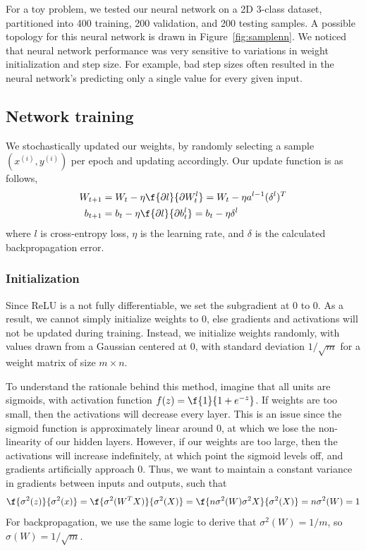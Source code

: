 \documentclass{article}
\begin{document}
\begin{multicols}{2}
For a toy problem, we tested our neural network on a 2D 3-class dataset,
partitioned into 400 training, 200 validation, and 200 testing samples.
A possible topology for this neural network is drawn in Figure~\ref{fig:samplenn}.
We noticed that neural network performance was very sensitive to 
variations in weight initialization and step size.
For example, bad step sizes often resulted in
the neural network's predicting only a single value for every given input.

\subsection{Network training}

We stochastically updated our weights,
by randomly selecting a sample $(x^{(i)}, y^{(i)})$ per epoch
and updating accordingly.
Our update function is as follows,
\begin{align}
W_{t+1} &= W_t - \eta \f{\partial l}{\partial W_t^l}
= W_t - \eta a^{l-1} (\delta^l)^T \\
b_{t+1} &= b_t - \eta \f{\partial l}{\partial b_t^l}
= b_t - \eta \delta^l
\end{align}
where $l$ is cross-entropy loss, $\eta$ is the learning rate,
and $\delta$ is the calculated backpropagation error.

\subsubsection{Initialization}

Since ReLU is a not fully differentiable,
we set the subgradient at 0 to 0.
As a result, we cannot simply initialize weights to 0,
else gradients and activations
will not be updated during training.
Instead, we initialize weights randomly,
with values drawn from a Gaussian centered at 0,
with standard deviation $1/\sqrt{m}$
for a weight matrix of size $m\times n$.

To understand the rationale behind this method,
imagine that all units are sigmoids,
with activation function $f(z) = \f{1}{1+e^{-z}}$.
If weights are too small, then the activations will decrease every layer.
This is an issue since the sigmoid function is approximately linear around 0,
at which we lose the non-linearity of our hidden layers.
However, if our weights are too large,
then the activations will increase indefinitely,
at which point the sigmoid levels off,
and gradients artificially approach 0.
Thus, we want to maintain a constant variance in gradients between
inputs and outputs, such that
\begin{equation}
\f{\sigma^2(z)}{\sigma^2(x)} = \f{\sigma^2(W^TX)}{\sigma^2(X)}
= \f{n\sigma^2(W)\sigma^2{X}}{\sigma^2(X)} = n\sigma^2(W) = 1
\end{equation}
For backpropagation, we use the same logic to derive that
$\sigma^2(W) = 1/m$, so $\sigma(W) = 1/\sqrt{m}$.


\end{multicols}
\end{document}
